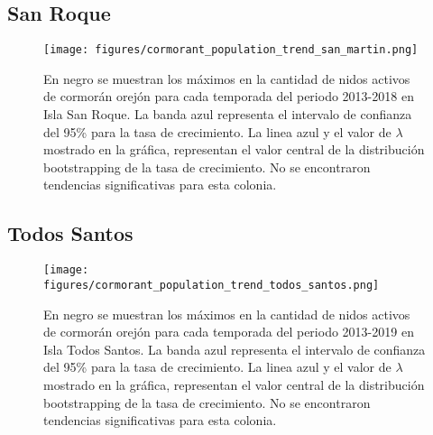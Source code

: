 \documentclass{article} %
\begin{document}
\subsection*{San Roque}

\begin{figure}[H]
\hspace{-2cm}
    \texttt{[image: figures/cormorant\_population\_trend\_san\_martin.png]}
\caption{En negro se muestran los máximos en la cantidad de nidos activos de cormorán orejón para cada temporada del periodo 2013-2018 en Isla San Roque. La banda azul representa el intervalo de confianza del 95\% para la tasa de crecimiento. La linea azul y el valor de $\lambda$ mostrado en la gráfica, representan el valor central de la distribución bootstrapping de la tasa de crecimiento. No se encontraron tendencias significativas para esta colonia.}
\end{figure}

\subsection*{Todos Santos}

\begin{figure}[H]
\hspace{-2cm}
    \texttt{[image: figures/cormorant\_population\_trend\_todos\_santos.png]}
\caption{En negro se muestran los máximos en la cantidad de nidos activos de cormorán orejón para cada temporada del periodo 2013-2019 en Isla Todos Santos. La banda azul representa el intervalo de confianza del 95\% para la tasa de crecimiento. La linea azul y el valor de $\lambda$ mostrado en la gráfica, representan el valor central de la distribución bootstrapping de la tasa de crecimiento. No se encontraron tendencias significativas para esta colonia.}
\end{figure}

 

\end{document}
